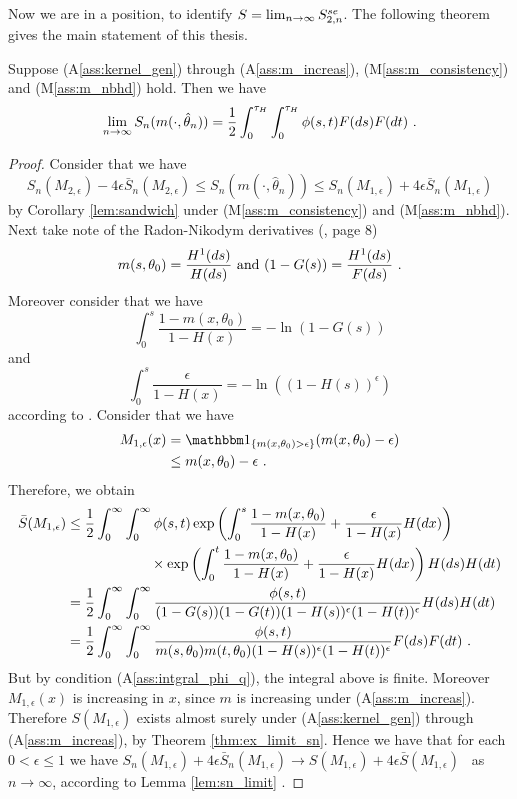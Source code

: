 Now we are in a position, to identify $S = \lim_{n\to\infty} S_{2,n}^{se}$. The following theorem gives the main statement of this thesis.
\begin{thm}
	Suppose (A\ref{ass:kernel_gen}) through (A\ref{ass:m_increas}), (M\ref{ass:m_consistency}) and (M\ref{ass:m_nbhd}) hold. Then we have
	$$\lim\limits_{n\to\infty} S_n(m(\cdot, \hat{\theta}_n)) = \frac{1}{2}\int_{0}^{\tau_H}\int_{0}^{\tau_H} \phi(s,t) F(ds)F(dt)\textrm{ .}$$
	\label{thm:snmn_limit}
	\begin{proof}
		Consider that we have
		$$S_n(M_{2,\epsilon}) - 4\epsilon \bar{S}_n(M_{2,\epsilon}) \leq S_n(m(\cdot, \hat\theta_n)) \leq S_n(M_{1,\epsilon}) + 4\epsilon \bar{S}_n(M_{1,\epsilon})$$
		by Corollary \ref{lem:sandwich} under (M\ref{ass:m_consistency}) and (M\ref{ass:m_nbhd}). Next take note of the Radon-Nikodym derivatives (\cf \cite{dikta2000strong}, page 8)
		$$m(s,\theta_0) = \frac{H^1(ds)}{H(ds)} \textrm{ and } (1-G(s)) = \frac{H^1(ds)}{F(ds)}\textrm{ .}$$
		Moreover consider that we have
		$$\int_{0}^{s} \frac{1-m(x,\theta_0)}{1-H(x)} = -\ln(1-G(s))$$
		and 
		$$\int_{0}^{s} \frac{\epsilon}{1-H(x)} = -\ln((1-H(s))^\epsilon)$$
		according to \cite{dikta2000strong}.
		Consider that we have 
		\begin{align*}
			M_{1,\epsilon}(x) &= \I{ m(x,\theta_0)>\epsilon}(m(x,\theta_0)-\epsilon)\\
			&\leq m(x,\theta_0)-\epsilon \mdot
		\end{align*}
		Therefore, we obtain
		\begin{align*}
			\bar{S}(M_{1,\epsilon}) &\leq \frac{1}{2}\int_{0}^{\infty} \int_{0}^{\infty} \phi(s,t)  \exp\left(\int_{0}^{s} \frac{1-m(x,\theta_0)}{1-H(x)} + \frac{\epsilon}{1-H(x)} H(dx)\right)\\
			&\qquad\qquad\qquad \times \exp\left(\int_{0}^{t} \frac{1-m(x,\theta_0)}{1-H(x)} + \frac{\epsilon}{1-H(x)} H(dx) \right)H(ds)H(dt)\\
			&= \frac{1}{2}\int_{0}^{\infty} \int_{0}^{\infty} \frac{\phi(s,t)}{(1-G(s))(1-G(t))(1-H(s))^\epsilon(1-H(t))^\epsilon} H(ds)H(dt)\\
			&= \frac{1}{2}\int_{0}^{\infty} \int_{0}^{\infty} \frac{\phi(s,t)}{m(s,\theta_0)m(t,\theta_0)(1-H(s))^\epsilon(1-H(t))^\epsilon} F(ds)F(dt)\textrm{ .}
		\end{align*}
		But by condition (A\ref{ass:intgral_phi_q}), the integral above is finite. Moreover $M_{1,\epsilon}(x)$ is increasing in $x$, since $m$ is increasing under (A\ref{ass:m_increas}). Therefore $S(M_{1,\epsilon})$ exists almost surely under (A\ref{ass:kernel_gen}) through (A\ref{ass:m_increas}), by Theorem \ref{thm:ex_limit_sn}. Hence we have that for each $0<\epsilon\leq1$ we have $S_n(M_{1,\epsilon}) + 4\epsilon \bar{S}_n(M_{1,\epsilon}) \to S(M_{1,\epsilon}) + 4\epsilon \bar{S}(M_{1,\epsilon})$ \wpo\ as $n\to\infty$, according to Lemma \ref{lem:sn_limit} . 

\end{proof}
\end{thm}
